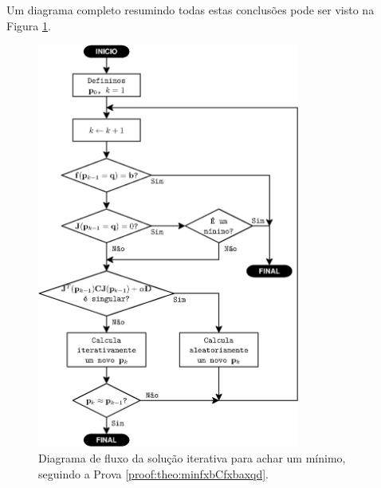 \begin{myproofT}
Um diagrama completo resumindo todas estas conclusões pode ser visto na Figura \ref{fig:fluxo2}.

\begin{figure}[!h]
     \centering
         \includegraphics[width=0.77\textwidth]{chapters/minimization-fx/fluxo2.eps}
        \caption{Diagrama de fluxo da solução iterativa para achar um mínimo, seguindo a Prova \ref{proof:theo:minfxbCfxbaxqd}.}
        \label{fig:fluxo2}
\end{figure}

\end{myproofT}

